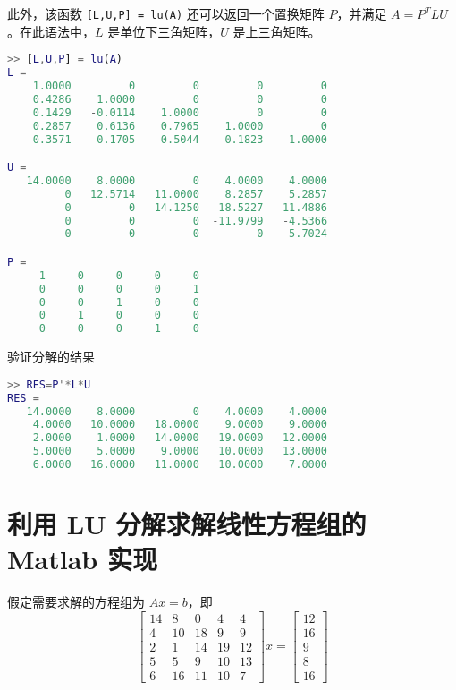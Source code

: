 此外，该函数 \lstinline|[L,U,P] = lu(A)| 还可以返回一个置换矩阵 $P$，并满足 $A = P^TLU$。在此语法中，$L$ 是单位下三角矩阵，$U$ 是上三角矩阵。
\begin{lstlisting}[language=Matlab]  
>> [L,U,P] = lu(A)
L =
    1.0000         0         0         0         0
    0.4286    1.0000         0         0         0
    0.1429   -0.0114    1.0000         0         0
    0.2857    0.6136    0.7965    1.0000         0
    0.3571    0.1705    0.5044    0.1823    1.0000

U =
   14.0000    8.0000         0    4.0000    4.0000
         0   12.5714   11.0000    8.2857    5.2857
         0         0   14.1250   18.5227   11.4886
         0         0         0  -11.9799   -4.5366
         0         0         0         0    5.7024

P =
     1     0     0     0     0
     0     0     0     0     1
     0     0     1     0     0
     0     1     0     0     0
     0     0     0     1     0
\end{lstlisting}


验证分解的结果
\begin{lstlisting}[language=Matlab]  
>> RES=P'*L*U
RES =
   14.0000    8.0000         0    4.0000    4.0000
    4.0000   10.0000   18.0000    9.0000    9.0000
    2.0000    1.0000   14.0000   19.0000   12.0000
    5.0000    5.0000    9.0000   10.0000   13.0000
    6.0000   16.0000   11.0000   10.0000    7.0000
\end{lstlisting}


\section{利用 LU 分解求解线性方程组的 Matlab 实现}
假定需要求解的方程组为 $Ax=b$，即
\begin{equation}
    \begin{bmatrix}
        14 & 8  & 0  & 4  & 4  \\
        4  & 10 & 18 & 9  & 9  \\
        2  & 1  & 14 & 19 & 12 \\
        5  & 5  & 9  & 10 & 13 \\
        6  & 16 & 11 & 10 & 7
    \end{bmatrix}
    x = 
    \begin{bmatrix}
        12 \\ 16 \\ 9 \\ 8 \\ 16
    \end{bmatrix}
\end{equation}

